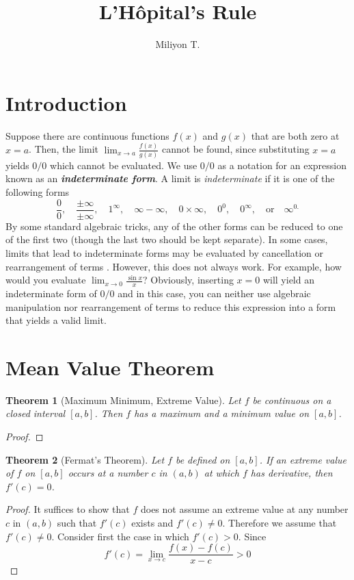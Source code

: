 \documentclass[a4paper]{amsproc}
\title{\textbf{L'H\^{o}pital's Rule}}
\author{Miliyon T.}
\theoremstyle{plain}
\newtheorem{thm}{Theorem}[section]
\numberwithin{equation}{section} %
\numberwithin{figure}{section} %
\theoremstyle{plain}
\theoremstyle{definition}
\theoremstyle{definition}
\theoremstyle{remark}
\begin{document}
\maketitle
\nocite{}



\section{Introduction}

Suppose there are continuous functions $f(x)$ and $g(x)$ that are both zero at $x=a$. Then,
the limit $\lim_{x \to a}{\frac{f(x)}{g(x)}}$ cannot be found, since substituting $x=a$ yields $0/0$ which cannot be evaluated.
We use $0/0$ as a notation for an expression known as an \textbf{\textit{indeterminate form}}. A limit is \textit{indeterminate}
if it is one of the following forms
\[
\frac{0}{0},\quad \frac{\pm\infty }{\pm\infty },\quad 1^{\infty },\quad \infty -\infty ,\quad 0\times \infty ,\quad 0^{0},\quad 0^{\infty },\quad \mathrm{or}\quad \infty ^{0.}\]
By some standard algebraic tricks, any of the other forms can be reduced to
one of the first two (though the last two should be kept separate). In some cases, limits that lead to
indeterminate forms may be evaluated by cancellation or rearrangement of terms \cite{Jun}.
However, this does not always work. For example, how would you evaluate $\lim_{x \to 0}{\frac{\sin{x}}{x}}$? Obviously,
inserting $x=0$ will yield an indeterminate form of $0/0$ and in this case, you can neither use algebraic manipulation nor
rearrangement of terms to reduce this expression into a form that yields a valid limit.


\section{Mean Value Theorem}
\begin{thm}[Maximum Minimum, Extreme Value]
Let $f$ be continuous on a closed interval $[a,b]$. Then $f$ has a maximum and a minimum value on $[a,b]$. 
\end{thm}

\begin{proof}

\end{proof}

\begin{thm}[Fermat's Theorem]
Let $f$ be defined on $[a,b]$. If an extreme value of $f$ on $[a,b]$ occurs at a number $c$ in $(a,b)$ at which $f$ has derivative, 
then $f'(c)=0$.
\end{thm}
\begin{proof}
It suffices to show that $f$ does not assume an extreme value at any number $c$ in $(a,b)$ such that $f'(c)$ exists and $f'(c)\neq 0$. 
Therefore we assume that $f'(c)\neq 0$. Consider first the case in which $f'(c)>0$. Since
\[
f'(c)=\lim_{x\to c}\frac{f(x)-f(c)}{x-c}>0
\] 

\end{proof}
\end{document}

